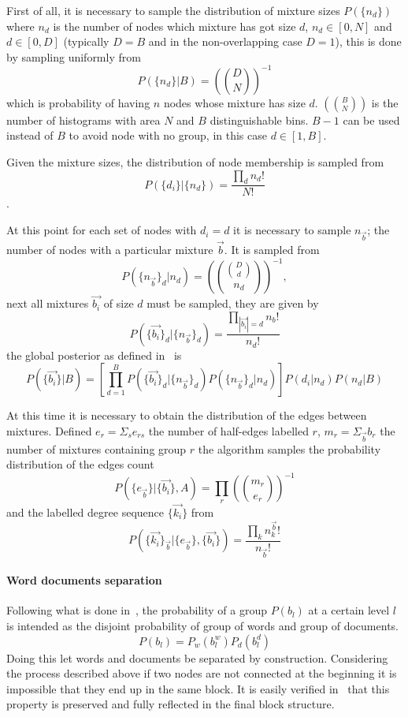 First of all, it is necessary to sample the distribution of mixture sizes
$P(\{n_d\})$ where $n_d$ is the number of nodes which mixture has got size $d$, $n_d\in[0,N]$ and $d\in[0,D]$ (typically $D=B$
and in the non-overlapping case $D=1$), this is done by sampling uniformly from
\[P(\{n_d\}|B)=\left(\binom{D}{N}\right)^{-1}\] which is probability of having $n$ nodes whose mixture has size $d$.
$\left(\binom{B}{N}\right)$ is the number of histograms with
area $N$ and $B$ distinguishable bins. $B-1$ can be used instead of $B$ to avoid node with no group, in this case $d\in[1,B]$.

Given the mixture sizes, the distribution of node membership
is sampled from \[P(\{d_i\}|\{n_d\})=\frac{\prod_{d} n_d!}{N!}\].

At this point for each set of nodes with $d_i=d$ it is necessary to sample $n_{\vec{b}}$; the number of nodes
with a particular mixture $\vec{b}$.
It is sampled from
\begin{equation}
  P(\{n_{\vec{b}}\}_d|n_d)=\left(\binom{\binom{D}{d}}{n_d}\right)^{-1},
\end{equation}
next all mixtures $\vec{b_i}$ of size $d$ must be sampled, they are given by
\begin{equation}
  P(\{\vec{b_i}\}_d|\{n_{\vec{b}}\}_d)=\frac{\prod_{|\vec{b_i}|=d} n_b!}{n_d!}
\end{equation}
the global posterior as defined in~\cite{peixoto2015model} is
\begin{equation}
  P(\{\vec{b_i}\}|B)=\left[\prod_{d=1}^B  P(\{\vec{b_i}\}_d|\{n_{\vec{b}}\}_d) P(\{n_{\vec{b}}\}_d|n_d)\right]P({d_i}|{n_d})P(n_d|B)
\end{equation}

At this time it is necessary to obtain the distribution of the edges between
mixtures. Defined $e_r=\Sigma_s e_{rs}$ the number of half-edges labelled $r$,
$m_r=\Sigma_{\vec{b}} b_r$ the number of mixtures containing group $r$ the
algorithm samples the probability distribution of the edges count
\[P(\{e_{\vec{b}}\}|\{\vec{b_i}\}, A)=\prod_r\left(\binom{m_r}{e_r}\right)^{-1}\] and the
labelled degree sequence $\{\vec{k_i}\}$ from
\[P(\{\vec{k_i}\}_{\vec{b}}|\{e_{\vec{b}}\}, \{\vec{b_i}\})=\frac{\prod_k n_k^{\vec{b}}!}{n_{\vec{b}}!}\]

\paragraph{Word documents separation}
Following what is done in~\cite{gerlach2018network}, the probability of a group $P(b_l)$ at a certain level $l$ is intended as the disjoint probability of
group of words and group of documents.
\begin{equation}
  P(b_l)=P_w(b_l^w)P_d(b_l^d)
\end{equation}
Doing this let words and documents be separated by construction.
Considering the process described above if two nodes are not connected at the beginning it is impossible
that they end up in the same block.
It is easily verified in~\cite{peixoto2014efficient} that this property is
preserved and fully reflected in the final block structure.
